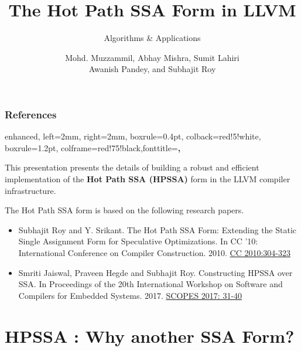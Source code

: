 \documentclass[aspectratio=169, compress]{beamer}
\title[Hot Path SSA in LLVM] %
{The Hot Path SSA Form in LLVM}
\subtitle{Algorithms \& Applications}
\author[Muzzammil, Mishra, Lahiri, Pandey, and Roy] %
{Mohd. Muzzammil\inst{1}, Abhay Mishra\inst{1}, Sumit Lahiri\inst{1} \\ Awanish Pandey\inst{2}, and Subhajit Roy\inst{1}}
\institute[IDK] %
{
	\inst{1}%
	Dept. Of Computer Science \& Engineering,
	IIT Kanpur \\
	\inst{2}%
	Qualcomm India Pvt. Ltd.
}
\date[01/03/2022] %
\begin{document}
\frame{\titlepage}
\begin{frame}
	\frametitle{References}
	\tcbset
	{
		enhanced,
		left=2mm,
		right=2mm,
		boxrule=0.4pt,
		colback=red!5!white,
		boxrule=1.2pt,
		colframe=red!75!black,fonttitle=\bfseries,
	}
	\begin{tcolorbox}[colback=red!3!white,colframe=red!50!black,lifted shadow={1mm}{-2mm}{3mm}{0.1mm}{black!50!white}]
	This presentation presents the details of building a robust and efficient implementation of the \textbf{Hot Path SSA (HPSSA)} form in the LLVM compiler infrastructure. 
	\end{tcolorbox}
	\pause \vspace{10pt}
	The Hot Path SSA form is based on the following research papers.
	\vspace{15pt}
	\begin{itemize}
		\setlength\itemsep{1em} 
		\item Subhajit Roy and Y. Srikant. The Hot Path SSA Form: Extending the Static Single Assignment Form for Speculative Optimizations. In CC '10: International Conference on Compiler Construction. 2010. \href{https://link.springer.com/chapter/10.1007/978-3-642-11970-5_17}{CC 2010:304-323} 
		\item Smriti Jaiswal, Praveen Hegde and Subhajit Roy. Constructing HPSSA over SSA. In Proceedings of the 20th International Workshop on Software and Compilers for Embedded Systems. 2017.
		\href{https://dl.acm.org/doi/10.1145/3078659.3078660}{SCOPES 2017: 31-40}
	\end{itemize}
\end{frame}
\footnotesize
\section{HPSSA : Why another SSA Form?}
\end{document}
